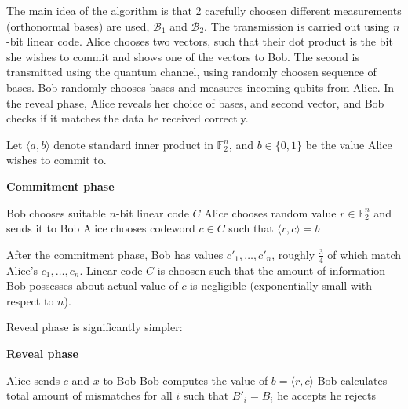\documentclass[10pt]{article}
\begin{document}
The main idea of the algorithm is that 2 carefully choosen different measurements (orthonormal bases) 
are used, \(\mathcal{B}_1\) and \(\mathcal{B}_2\). The transmission is carried out using \(n\)-bit 
linear code. Alice chooses two vectors, such that their dot product is the bit she wishes to commit and
shows one of the vectors to Bob. The second is transmitted using the quantum channel, using randomly
choosen sequence of bases. Bob randomly chooses bases and measures incoming qubits from Alice. In the
reveal phase, Alice reveals her choice of bases, and second vector, and Bob checks if it matches
the data he received correctly.


Let \(\langle a,b\rangle\) denote standard inner product in \(\mathbb{F}_2^n\), and \(b\in\{0,1\}\) 
be the value Alice wishes to commit to.

\vspace{2mm}

\NoCaptionOfAlgo
\begin{algorithm}[H]
\caption{\textbf{Commitment phase}}
Bob chooses suitable \(n\)-bit linear code \(C\) \;
Alice chooses random value \(r\in\mathbb{F}_2^n\) and sends it to Bob \;
Alice chooses codeword \(c\in C\) such that \(\langle r,c\rangle = b\) \;
\end{algorithm}
\vspace{2mm}


After the commitment phase, Bob has values \(c'_1,\ldots,c'_n\), roughly \(\frac{3}{4}\) of 
which match Alice's \(c_1,\ldots,c_n\). Linear code \(C\) is choosen such that the amount of
information Bob possesses about actual value of \(c\) is negligible (exponentially small with
respect to \(n\)).

Reveal phase is significantly simpler:

\vspace{2mm}

\NoCaptionOfAlgo
\begin{algorithm}[H]
\caption{\textbf{Reveal phase}}
Alice sends \(c\) and \(x\) to Bob \;
Bob computes the value of \(b=\langle r,c\rangle\) \;
Bob calculates total amount of mismatches for all \(i\) such that \(B'_i=B_i\) \;
 {
  he accepts
}{
  he rejects
}
\end{algorithm}
\vspace{2mm}
\end{document}
